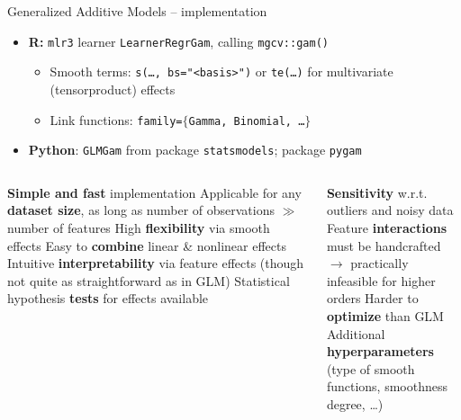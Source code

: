 \begin{frame}{Generalized Additive Models -- implementation}


\begin{itemize}
  \item \textbf{R:} \texttt{mlr3} learner \texttt{LearnerRegrGam},
    calling \texttt{mgcv::gam()}
  \begin{itemize}
      \item Smooth terms: \texttt{s(\dots, bs="<basis>")} or \texttt{te(\dots)}
      for multivariate (tensorproduct) effects
      \item Link functions: \texttt{family=$\{$Gamma, Binomial, \dots $\}$}
  \end{itemize}
    \item \textbf{Python}: \texttt{GLMGam} from package \texttt{statsmodels};
    package \texttt{pygam}
\end{itemize}

\medskip
\begin{columns}[onlytextwidth]
  \begin{column}{0.5\textwidth}

    \begin{itemize}
      \positem \textbf{Simple and fast} implementation
      \positem Applicable for any \textbf{dataset size}, as long as number of
      observations $\gg$ number of features
      \positem High \textbf{flexibility} via smooth effects
      \positem Easy to \textbf{combine} linear \& nonlinear effects
      \positem Intuitive \textbf{interpretability} via feature effects (though
      not quite as straightforward as in GLM)
      \positem Statistical hypothesis \textbf{tests} for effects available
    \end{itemize}
  \end{column}

  \begin{column}{0.5\textwidth}

    \begin{itemize}
      \negitem \textbf{Sensitivity} w.r.t. outliers and noisy data
      \negitem Feature \textbf{interactions} must be handcrafted\\
      $\rightarrow$ practically infeasible for higher orders
      \negitem Harder to \textbf{optimize} than GLM
      \negitem Additional \textbf{hyperparameters} (type of smooth functions,
      smoothness degree, \dots)
    \end{itemize}
  \end{column}
\end{columns}

\end{frame}
